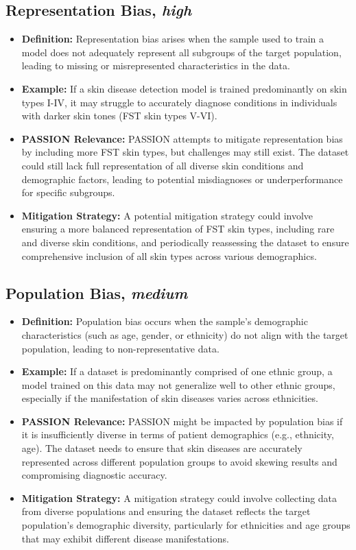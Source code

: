 \begin{refsection}
		\subsection{Representation Bias, \textit{high}}
		\begin{itemize}
			\item \textbf{Definition:} Representation bias arises when the sample used to train a model does not adequately represent all subgroups of the target population, leading to missing or misrepresented characteristics in the data.
			\item \textbf{Example:} If a skin disease detection model is trained predominantly on skin types I-IV, it may struggle to accurately diagnose conditions in individuals with darker skin tones (FST skin types V-VI).
			\item \textbf{PASSION Relevance:} PASSION attempts to mitigate representation bias by including more FST skin types, but challenges may still exist. The dataset could still lack full representation of all diverse skin conditions and demographic factors, leading to potential misdiagnoses or underperformance for specific subgroups.
			\item \textbf{Mitigation Strategy:} A potential mitigation strategy could involve ensuring a more balanced representation of FST skin types, including rare and diverse skin conditions, and periodically reassessing the dataset to ensure comprehensive inclusion of all skin types across various demographics.
		\end{itemize}
		
		\subsection{Population Bias, \textit{medium}}
		\begin{itemize}
			\item \textbf{Definition:} Population bias occurs when the sample's demographic characteristics (such as age, gender, or ethnicity) do not align with the target population, leading to non-representative data.
			\item \textbf{Example:} If a dataset is predominantly comprised of one ethnic group, a model trained on this data may not generalize well to other ethnic groups, especially if the manifestation of skin diseases varies across ethnicities.
			\item \textbf{PASSION Relevance:} PASSION might be impacted by population bias if it is insufficiently diverse in terms of patient demographics (e.g., ethnicity, age). The dataset needs to ensure that skin diseases are accurately represented across different population groups to avoid skewing results and compromising diagnostic accuracy.
			\item \textbf{Mitigation Strategy:} A mitigation strategy could involve collecting data from diverse populations and ensuring the dataset reflects the target population’s demographic diversity, particularly for ethnicities and age groups that may exhibit different disease manifestations.
		\end{itemize}
		

\end{refsection}
